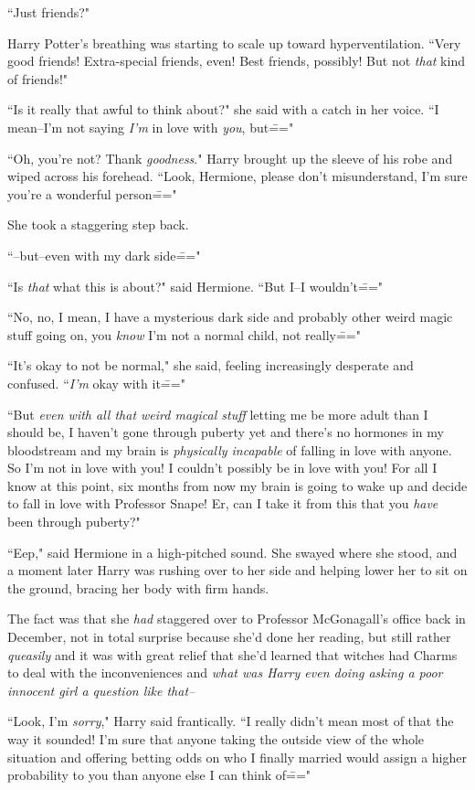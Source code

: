 ``Just friends?"

Harry Potter's breathing was starting to scale up toward hyperventilation. ``Very good friends! Extra-special friends, even! Best friends, possibly! But not \emph{that} kind of friends!"

``Is it really that awful to think about?" she said with a catch in her voice. ``I mean\---I'm not saying \emph{I'm} in love with \emph{you}, but\==="

``Oh, you're not? Thank \emph{goodness}." Harry brought up the sleeve of his robe and wiped across his forehead. ``Look, Hermione, please don't misunderstand, I'm sure you're a wonderful person\==="

She took a staggering step back.

``\---but\---even with my dark side\==="

``Is \emph{that} what this is about?" said Hermione. ``But I\---I wouldn't\==="

``No, no, I mean, I have a mysterious dark side and probably other weird magic stuff going on, you \emph{know} I'm not a normal child, not really\==="

``It's okay to not be normal," she said, feeling increasingly desperate and confused. ``\emph{I'm} okay with it\==="

``But \emph{even with all that weird magical stuff} letting me be more adult than I should be, I haven't gone through puberty yet and there's no hormones in my bloodstream and my brain is \emph{physically incapable} of falling in love with anyone. So I'm not in love with you! I couldn't possibly be in love with you! For all I know at this point, six months from now my brain is going to wake up and decide to fall in love with Professor Snape! Er, can I take it from this that you \emph{have} been through puberty?"

``Eep," said Hermione in a high-pitched sound. She swayed where she stood, and a moment later Harry was rushing over to her side and helping lower her to sit on the ground, bracing her body with firm hands.

The fact was that she \emph{had} staggered over to Professor McGonagall's office back in December, not in total surprise because she'd done her reading, but still rather \emph{queasily} and it was with great relief that she'd learned that witches had Charms to deal with the inconveniences and \emph{what was Harry even doing asking a poor innocent girl a question like that\---}

``Look, I'm \emph{sorry}," Harry said frantically. ``I really didn't mean most of that the way it sounded! I'm sure that anyone taking the outside view of the whole situation and offering betting odds on who I finally married would assign a higher probability to you than anyone else I can think of\==="

